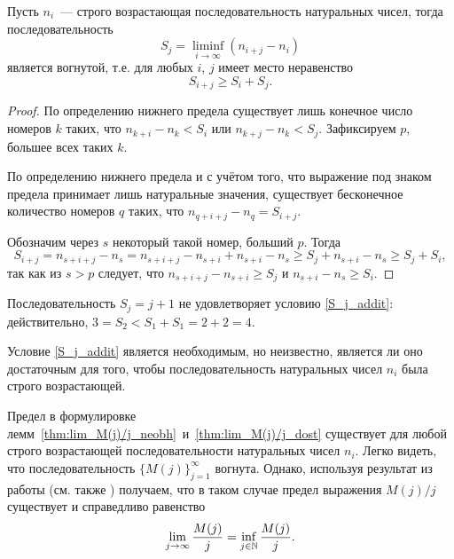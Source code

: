 \begin{lemma}
	\label{lem:convex_sequence_S_j}
	Пусть $n_i$~--- строго возрастающая последовательность натуральных чисел,
	тогда последовательность
	\begin{equation}
		S_j = \liminf_{i\to\infty} \left(n_{i+j} - n_i\right)
	\end{equation}
	является вогнутой, т.е. для любых $i$, $j$ имеет место неравенство
	\begin{equation}\label{S_j_addit}
		S_{i+j} \geq S_i + S_j
		.
	\end{equation}
\end{lemma}

\begin{proof}
	По определению нижнего предела существует лишь конечное число номеров $k$
	таких, что $n_{k+i} - n_k < S_i$ или $n_{k+j} - n_k < S_j$.
	Зафиксируем $p$, большее всех таких $k$.

	По определению нижнего предела и с учётом того, что выражение под знаком предела
	принимает лишь натуральные значения,
	существует бесконечное количество номеров $q$ таких, что $n_{q+i+j} - n_q = S_{i+j}$.

	Обозначим через $s$ некоторый такой номер, больший $p$.
	Тогда
	\begin{equation}
		S_{i+j} = n_{s+i+j} - n_s = n_{s+i+j} - n_{s+i} + n_{s+i} - n_s
		\geq S_j + n_{s+i} - n_s \geq S_j + S_i,
	\end{equation}
	так как из $s>p$ следует, что $n_{s+i+j} - n_{s+i} \geq S_j$ и $n_{s+i} - n_s \geq S_i$.
\end{proof}

\begin{example}
	Последовательность $S_j = j+1$ не удовлетворяет условию \eqref{S_j_addit}:
	действительно, $3=S_2 < S_1+S_1 = 2+2 = 4$.
\end{example}

\begin{remark}
	Условие \eqref{S_j_addit} является необходимым, но неизвестно, является ли оно достаточным
	для того, чтобы последовательность натуральных чисел $n_i$ была строго возрастающей.
\end{remark}

\begin{remark}
	Предел в формулировке лемм~\ref{thm:lim_M(j)/j_neobh}~и~\ref{thm:lim_M(j)/j_dost}
	существует для любой строго возрастающей последовательности натуральных чисел $n_i$.
	Легко видеть, что последовательность $\{M(j)\}_{j=1}^\infty$ вогнута.
	Однако, используя результат из работы \cite{Fekete} (см. также \cite[I, Задача 98]{polia1978zadachi}) получаем,
	что в таком случае предел выражения $M(j)/j$ существует и справедливо равенство
	\begin{equation}
		\lim_{j\to\infty}\frac{M(j)}{j} =\inf_{j\in\mathbb{N}}\frac{M(j)}{j}
		.
	\end{equation}
\end{remark}
